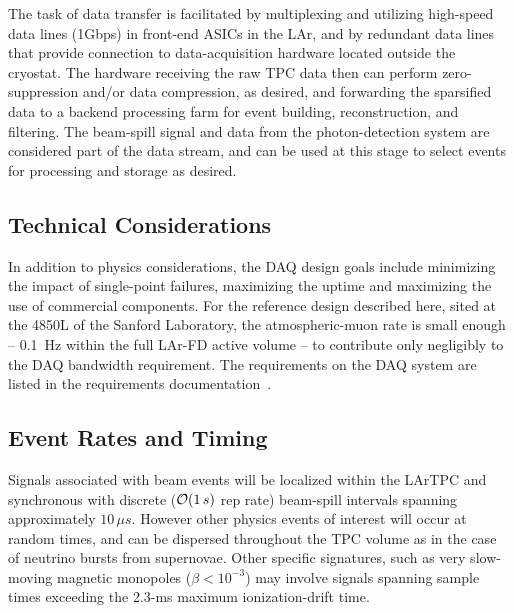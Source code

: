 The task of data transfer is facilitated by multiplexing and utilizing
high-speed data lines (1Gbps) in front-end ASICs in the LAr, and by
redundant data lines that provide connection to data-acquisition
hardware located outside the cryostat.  The hardware receiving the raw
TPC data then can perform zero-suppression and/or data compression, as
desired, and forwarding the sparsified data to a backend processing
farm for event building, reconstruction, and filtering.  
The \LBNE beam-spill signal and data from the photon-detection system
are considered part of the data stream, and can be used at this stage
to select events for processing and storage as desired.

\subsection{Technical Considerations}
In addition to physics considerations, the DAQ design goals include  
minimizing the impact of single-point failures, maximizing the uptime and maximizing 
the use of commercial components.  
For the reference design described here, sited at the 4850L of the Sanford Laboratory, the 
atmospheric-muon rate is small enough -- 0.1~Hz within the full LAr-FD active 
volume -- to contribute only negligibly to the DAQ bandwidth requirement.
The requirements on the DAQ system are listed in the
requirements documentation~\cite{lar-fd-req}.

\subsection{Event Rates and Timing}
\label{sec:v5-daq-assumptions}


Signals associated with beam events will be localized within the 
LArTPC and synchronous with discrete (${\cal O}(1\,s)$ rep rate) 
beam-spill intervals spanning 
approximately $10\,\mu s$.  
However other physics events of interest will occur at random 
times, and can be dispersed throughout the TPC volume as in the case 
of neutrino bursts from supernovae.  Other specific signatures, such 
as very slow-moving magnetic monopoles ($\beta < 10^{-3}$) may involve 
signals spanning sample times exceeding the 2.3-ms maximum ionization-drift time.  

